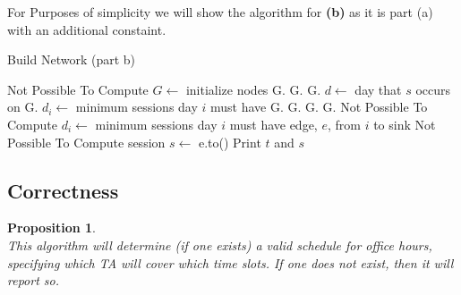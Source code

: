 \documentclass[12pt]{article}
\newtheorem{proposition}[theorem]{Proposition}
\begin{document}
\noindent For Purposes of simplicity we will show the algorithm for \textbf{(b)} as it is part (a) with an additional constaint.
\begin{algorithm}[H]
\caption{Build Network (part b)}
\begin{algorithmic}
    \EndProcedure
            Not Possible To Compute
        \EndIf
        \State $G \gets$ initialize nodes
            \State G.
            \State G.
                \State G.
            \EndFor
        \EndFor
        \State {}
            \State $d \gets$ day that $s$ occurs on
            \State G.
        \EndFor
            \State $d_i \gets$ minimum sessions day $i$ must have
            \State G.
            \State G.
        \EndFor
        \State G.
        \State G.
                Not Possible To Compute
            \EndIf
        \EndFor
            \State $d_i \gets$ minimum sessions day $i$ must have
            \State edge, $e$, from $i$ to sink
                Not Possible To Compute
            \EndIf
        \EndFor
                    \State session $s \gets$ e.to()
                    \State Print $t$ and $s$
                \EndIf
            \EndFor
        \EndFor
    \EndProcedure
\end{algorithmic}
\end{algorithm}


\newpage
\subsection{Correctness}
\begin{proposition}
~ \\ \indent This algorithm will determine (if one exists) a valid schedule for office hours,
specifying which TA will cover which time slots. If one does not exist, then it will report so.
\end{proposition}
\end{document}
